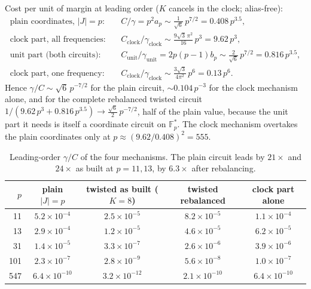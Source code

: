 \documentclass[11pt]{article}
\theoremstyle{remark}
\newcommand{\F}{\mathbb{F}}
\newcommand{\cost}{C}
\newcommand{\gam}{\gamma}
\newcommand{\abs}[1]{\lvert #1 \rvert}
\begin{document}
Cost per unit of margin at leading order ($K$ cancels in the clock; alias-free):
\begin{align*}
\text{plain coordinates, } \abs{J} = p: &\quad \cost/\gam = p^2 a_p \sim \tfrac{1}{\sqrt6}\, p^{7/2} = 0.408\, p^{3.5}, \\
\text{clock part, all frequencies:} &\quad \cost_{\mathrm{clock}}/\gam_{\mathrm{clock}} \sim \tfrac{9\sqrt3\,\pi^2}{16}\, p^3 = 9.62\, p^{3}, \\
\text{unit part (both circuits):} &\quad \cost_{\mathrm{unit}}/\gam_{\mathrm{unit}} = 2p(p-1)b_p \sim \tfrac{2}{\sqrt6}\, p^{7/2} = 0.816\, p^{3.5}, \\
\text{clock part, one frequency:} &\quad \cost_{\mathrm{clock}}/\gam_{\mathrm{clock}} \sim \tfrac{3\sqrt3}{4\pi^2}\, p^6 = 0.13\, p^{6}.
\end{align*}
Hence $\gam/\cost \sim \sqrt6\, p^{-7/2}$ for the plain circuit, $\sim 0.104\, p^{-3}$ for the clock mechanism alone, and for the
complete rebalanced twisted circuit $1/(9.62\,p^3 + 0.816\,p^{3.5}) \to \tfrac{\sqrt6}{2}\, p^{-7/2}$, half of the plain value, because
the unit part it needs is itself a coordinate circuit on $\F_p^{*}$. The clock mechanism overtakes the plain coordinates only at
$p \approx (9.62/0.408)^2 = 555$.

\begin{table}[h]\centering
\begin{tabular}{r c c c c}
\toprule
$p$ & plain $\abs{J}=p$ & twisted as built ($K=8$) & twisted rebalanced & clock part alone \\
\midrule
11   & $5.2\times10^{-4}$  & $2.5\times10^{-5}$  & $8.2\times10^{-5}$  & $1.1\times10^{-4}$ \\
13   & $2.9\times10^{-4}$  & $1.2\times10^{-5}$  & $4.6\times10^{-5}$  & $6.2\times10^{-5}$ \\
31   & $1.4\times10^{-5}$  & $3.3\times10^{-7}$  & $2.6\times10^{-6}$  & $3.9\times10^{-6}$ \\
101  & $2.3\times10^{-7}$  & $2.8\times10^{-9}$  & $5.6\times10^{-8}$  & $1.0\times10^{-7}$ \\
547  & $6.4\times10^{-10}$ & $3.2\times10^{-12}$ & $2.1\times10^{-10}$ & $6.4\times10^{-10}$ \\
\bottomrule
\end{tabular}
\caption{Leading-order $\gam/\cost$ of the four mechanisms. The plain circuit leads by $21\times$ and $24\times$ as built at
$p = 11, 13$, by $6.3\times$ after rebalancing.}
\end{table}
\end{document}

